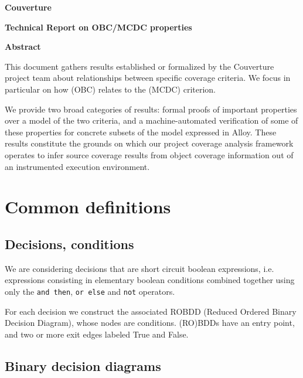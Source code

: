 \documentclass[a4paper,12pt,twoside]{article}
\newcommand{\couv}{{\sc Couverture}}
\newcommand{\andthen}{\texttt{and then}}
\newcommand{\orelse}{\texttt{or else}}
\newcommand{\adanot}{\texttt{not}}
\begin{document}
\pagestyle{empty}

\vfill

\begin{center}%
{\Large \textbf{\couv{}}}

{\Large \textbf{Technical Report on OBC/MCDC properties}}

\vfill

{\large \textbf{Abstract}}
\end{center}

This document gathers results established or formalized by the \couv{}
project team about relationships between specific coverage criteria.
%
We focus in particular on how  (OBC) relates to the
 (MCDC) criterion.

We provide two broad categories of results: formal proofs of important
properties over a model of the two criteria, and a machine-automated
verification of some of these properties for concrete subsets of the model
expressed in Alloy.
%
These results constitute the grounds on which our project coverage analysis
framework operates to infer source coverage results from object coverage
information out of an instrumented execution environment.

\vfill

\newpage
\pagestyle{plain}


\section{Common definitions}

\subsection{Decisions, conditions}

We are considering decisions that are short circuit boolean expressions,
i.e. expressions consisting in elementary boolean conditions combined
together using only the \andthen{}, \orelse{} and \adanot{} operators.

For each decision we construct the associated ROBDD (Reduced Ordered
Binary Decision Diagram), whose nodes are conditions. (RO)BDDs have an
entry point, and two or more exit edges labeled True and False.

\subsection{Binary decision diagrams}
\end{document}
